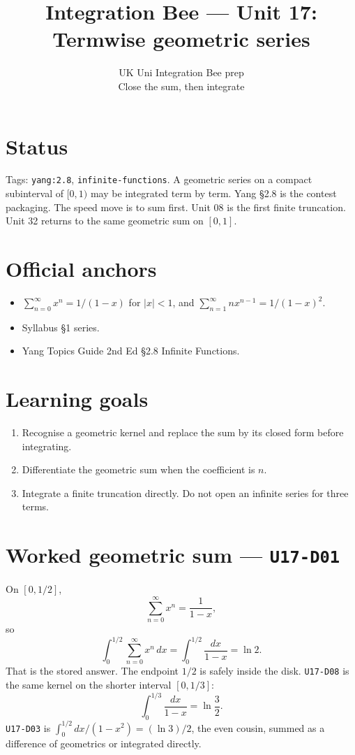 
\title{Integration Bee --- Unit 17:\\ Termwise geometric series}
\author{UK Uni Integration Bee prep\\ Close the sum, then integrate}
\date{}

\maketitle
\section*{Status}
Tags: \texttt{yang:2.8}, \texttt{infinite-functions}.
A geometric series on a compact subinterval of $[0,1)$ may be integrated term by term. Yang \S2.8 is the contest packaging. The speed move is to sum first. Unit 08 is the first finite truncation. Unit 32 returns to the same geometric sum on $[0,1]$.
\section{Official anchors}
\begin{itemize}
  \item $\sum_{n=0}^{\infty}x^n=1/(1-x)$ for $|x|<1$, and $\sum_{n=1}^{\infty}n x^{n-1}=1/(1-x)^2$.
  \item Syllabus §1 series.
  \item Yang Topics Guide 2nd Ed §2.8 Infinite Functions.
\end{itemize}
\section{Learning goals}
\begin{enumerate}
  \item Recognise a geometric kernel and replace the sum by its closed form before integrating.
  \item Differentiate the geometric sum when the coefficient is $n$.
  \item Integrate a finite truncation directly. Do not open an infinite series for three terms.
\end{enumerate}

\section{Worked geometric sum --- \texttt{U17-D01}}
On $[0,1/2]$,
\[
\sum_{n=0}^{\infty}x^n=\frac{1}{1-x},
\]
so
\[
\int_0^{1/2}\sum_{n=0}^{\infty}x^n\,dx=\int_0^{1/2}\frac{dx}{1-x}=\ln 2.
\]
That is the stored answer. The endpoint $1/2$ is safely inside the disk. \texttt{U17-D08} is the same kernel on the shorter interval $[0,1/3]$:
\[
\int_0^{1/3}\frac{dx}{1-x}=\ln\frac32.
\]
\texttt{U17-D03} is $\int_0^{1/2}dx/(1-x^2)=(\ln 3)/2$, the even cousin, summed as a difference of geometrics or integrated directly.

